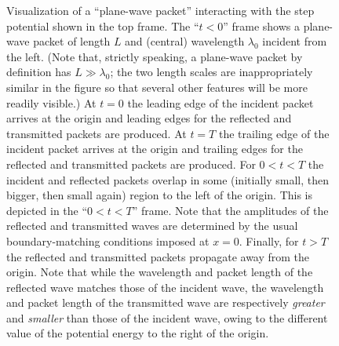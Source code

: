 \documentclass[aps,prc,onecolumn,letterpaper,floatfix,12pt]{revtex4}
\begin{document}
\begin{figure}[t]
\begin{center}
\caption{Visualization of a ``plane-wave packet'' interacting with the
step potential shown in the top frame.  The ``$t<0$'' frame shows a
plane-wave packet of length $L$ and (central) wavelength $\lambda_0$
incident from the left.  (Note that, strictly speaking, a plane-wave
packet by definition has $L \gg \lambda_0$; the two length scales
are inappropriately similar in the figure so that several other features
will be more readily visible.)  At $t=0$ the leading edge of the
incident packet arrives at the origin and leading edges for the
reflected and transmitted packets are produced.  At $t=T$ the
trailing edge of the incident packet arrives at the origin and
trailing edges for the reflected and transmitted packets are
produced.  For $0 < t < T$ the incident and reflected packets
overlap in some (initially small, then bigger, then small again)
region to the left of the origin.  This is depicted in the
``$0<t<T$'' frame.  Note that the amplitudes of the reflected and
transmitted waves are determined by the usual boundary-matching
conditions imposed at $x=0$.  Finally, for $t>T$ the reflected and
transmitted packets propagate away from the origin.  Note that while
the wavelength and packet length of the reflected wave matches those
of the incident wave, the wavelength and packet length of the transmitted wave are
respectively \emph{greater} and \emph{smaller} than those of the
incident wave, owing to the different value of the potential energy to
the right of the origin. 
\label{fig1}
}
\end{center}
\end{figure}
\end{document}
